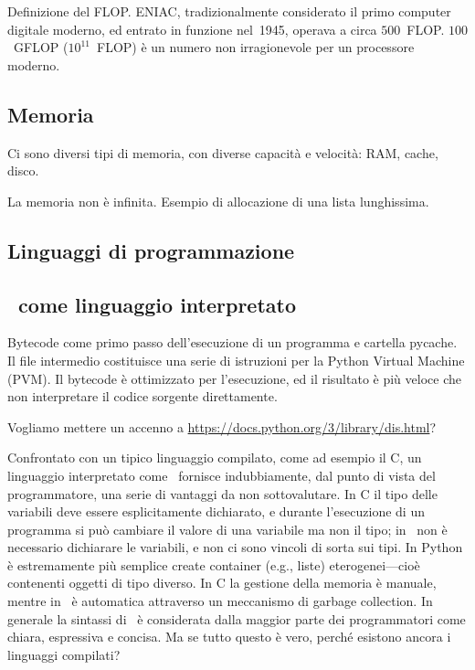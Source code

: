 Definizione del FLOP. ENIAC, tradizionalmente considerato il primo computer digitale
moderno, ed entrato in funzione nel~1945, operava a circa $500$~FLOP. $100$~GFLOP
($10^{11}$~FLOP) \`e un numero non irragionevole per un processore moderno.


\subsection{Memoria}


Ci sono diversi tipi di memoria, con diverse capacit\`a e velocit\`a: RAM, cache,
disco.

La memoria non \`e infinita. Esempio di allocazione di una lista lunghissima.


\subsection{Linguaggi di programmazione}



\subsection{\python\ come linguaggio interpretato}

Bytecode come primo passo dell'esecuzione di un programma e cartella pycache.
Il file intermedio costituisce una serie di istruzioni per la Python Virtual Machine (PVM).
Il bytecode \`e ottimizzato per l'esecuzione, ed il risultato \`e pi\`u veloce che
non interpretare il codice sorgente direttamente.

Vogliamo mettere un accenno a \url{https://docs.python.org/3/library/dis.html}?

Confrontato con un tipico linguaggio compilato, come ad esempio il C, un linguaggio
interpretato come \python\ fornisce indubbiamente, dal punto di vista del programmatore,
una serie di vantaggi da non sottovalutare. In C il tipo delle variabili deve essere
esplicitamente dichiarato, e durante l'esecuzione di un programma si pu\`o cambiare
il valore di una variabile ma non il tipo; in \python\ non \`e necessario dichiarare
le variabili, e non ci sono vincoli di sorta sui tipi. In Python \`e estremamente
pi\`u semplice create container (e.g., liste) eterogenei---cio\`e contenenti oggetti
di tipo diverso. In C la gestione della memoria \`e manuale, mentre in \python\
\`e automatica attraverso un meccanismo di garbage collection. In generale la sintassi
di \python\ \`e considerata dalla maggior parte dei programmatori come chiara, espressiva
e concisa. Ma se tutto questo \`e vero, perch\'e esistono ancora i linguaggi compilati?

